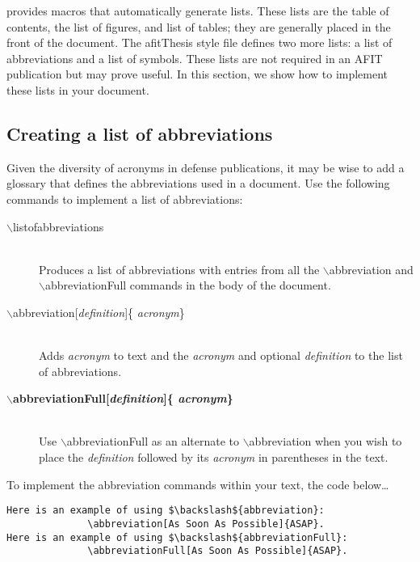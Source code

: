 \Latex provides macros that automatically generate lists.  These lists
are the table of contents, the list of figures, and list of tables;
they are generally placed in the front of the document.  The afitThesis
style file defines two more lists: a list of abbreviations and a list
of symbols.  These lists are not required in an AFIT publication but
may prove useful.  In this section, we show how to implement these
lists in your document.

\subsection{Creating a list of abbreviations}

Given the diversity of acronyms in defense publications, it may
be wise to add a glossary that defines the abbreviations used in a
document.  Use the following commands to implement a list of
abbreviations:

\begin{description}
    \item[$\backslash${listofabbreviations}] ~\\Produces a list of
    abbreviations with entries from all the $\backslash${abbreviation}
    and $\backslash${abbreviationFull} commands in the body of the
    document.

    \item[$\backslash${abbreviation}[{\em definition}{]}\{{\em
    acronym}\}] ~\\Adds {\em acronym} to text and the {\em
    acronym} and optional {\em definition} to the list of
    abbreviations.

    \item[\bf $\backslash${abbreviationFull}[{\em definition}{]}\{{\em
    acronym}\}] ~\\Use $\backslash${abbreviationFull} as an alternate
    to $\backslash$abbreviation when you wish to place the {\em
    definition} followed by its {\em acronym} in parentheses in the
    text.
\end{description}

\noindent To implement the abbreviation commands within your text, the code
below\ldots

\begin{verbatim}
Here is an example of using $\backslash${abbreviation}: 
              \abbreviation[As Soon As Possible]{ASAP}.
Here is an example of using $\backslash${abbreviationFull}:  
              \abbreviationFull[As Soon As Possible]{ASAP}.
\end{verbatim}

